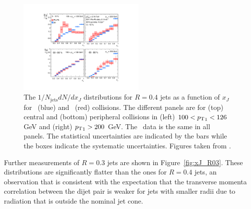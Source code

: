 \begin{figure}[htbp]
\begin{center}
\includegraphics[width=0.55\textwidth]{figures/jetMeasurements/xJ}
\caption{The $1/N_\mathrm{jets} dN/dx_J$ distributions for $R=0.4$ jets as a function of $x_J$ for \pp\ (blue) and \pbpb\ (red) collisions.
The different panels are for (top) central and (bottom) peripheral collisions in (left) $100 < \mbox{$p_{\mathrm{T}}$}_1 < 126$ GeV and (right) $\mbox{$p_{\mathrm{T}}$}_1 > 200 $ GeV.
The \pp\ data is the same in all panels.
The statistical uncertainties are indicated by the bars while the boxes indicate the systematic uncertainties.
Figures taken from \cite{Aaboud:2017eww}.}
\label{fig:xJ}
\end{center}
\end{figure}

Further measurements of $R = 0.3$ jets are shown in Figure~\ref{fig:xJ_R03}.
These distributions are significantly flatter than the ones for $R=0.4$ jets, an observation that is consistent with the expectation that the transverse momenta correlation between the dijet pair is weaker for jets with smaller radii due to radiation that is outside the nominal jet cone.

